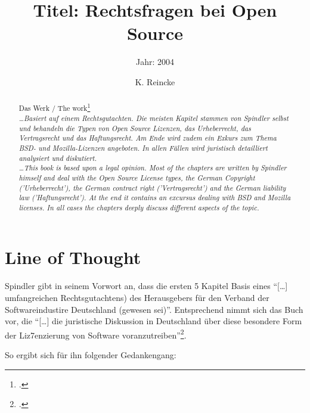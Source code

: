 \documentclass[DIV=calc,BCOR=5mm,11pt,headings=small,oneside,abstract=true, toc=bib]{scrartcl}
\begin{document}

\titlehead{Literaturexzerpt}
\subject{Autor(en): Spindler}
\title{Titel: Rechtsfragen bei Open Source}
\subtitle{Jahr: 2004 }
\author{K. Reincke}

\maketitle

\begin{abstract}
\noindent
Das Werk / The work\footcite[][]{Spindler2004a} \\
\noindent \itshape
\ldots Basiert auf einem Rechtsgutachten. Die meisten Kapitel stammen von
Spindler selbst und behandeln die Typen von Open Source Lizenzen, das
Urheberrecht, das Vertragsrecht und das Haftungsrecht. Am Ende wird zudem ein
Exkurs zum Thema BSD- und Mozilla-Lizenzen angeboten. In allen Fällen wird
juristisch detailliert analysiert und diskutiert. \\
\noindent
\ldots This book is based upon a legal opinion. Most of the chapters are written
by Spindler himself and deal with the Open Source License types, the German
Copyright ('Urheberrecht'), the German contract right ('Vertragsrecht') and the
German liability law ('Haftungsrecht'). At the end it contains an excursus
dealing with BSD and Mozilla licenses. In all cases the chapters deeply discuss
different aspects of the topic.
\end{abstract}
\footnotesize
\normalsize

\section{Line of Thought}

Spindler gibt in seinem Vorwort an, dass die ersten 5 Kapitel Basis eines
\enquote{[\ldots] umfangreichen Rechtsgutachtens) des Herausgebers für den Verband
der Softwareindustire Deutschland (gewesen sei)}. Entsprechend nimmt sich
das Buch vor, die \enquote{[\ldots] die juristische Diskussion in Deutschland über
diese besondere Form der Liz7enzierung von Software
voranzutreiben}\footcite[vgl.][V]{Spindler2004a}.

So ergibt sich für ihn folgender Gedankengang:
\end{document}
